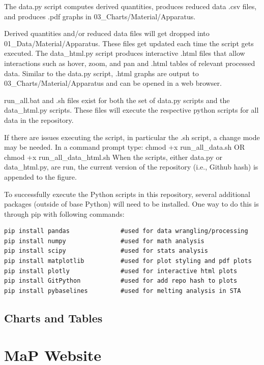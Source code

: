 \documentclass[12pt,oneside]{book}
\begin{document}
The data.py script computes derived quantities, produces reduced data .csv files, and produces .pdf graphs in 03\_Charts/Material/Apparatus.

Derived quantities and/or reduced data files will get dropped into 01\_Data/Material/Apparatus. These files get updated each time the script gets executed.
The data\_html.py script produces interactive .html files that allow interactions such as hover, zoom, and pan and .html tables of relevant processed data. Similar to the data.py script, .html graphs are output to 03\_Charts/Material/Apparatus and can be opened in a web browser.

run\_all.bat and .sh files exist for both the set of data.py scripts and the data\_html.py scripts. These files will execute the respective python scripts for all data in the repository.

If there are issues executing the script, in particular the .sh script, a change mode may be needed. In a command prompt type:
chmod +x run\_all\_data.sh OR chmod +x run\_all\_data\_html.sh
When the scripts, either data.py or data\_html.py, are run, the current version of the repository (i.e., Github hash) is appended to the figure.

To successfully execute the Python scripts in this repository, several additional packages (outside of base Python) will need to be installed. One way to do this is through pip with following commands:

\begin{verbatim}
pip install pandas              #used for data wrangling/processing
pip install numpy               #used for math analysis
pip install scipy               #used for stats analysis
pip install matplotlib          #used for plot styling and pdf plots
pip install plotly              #used for interactive html plots
pip install GitPython           #used for add repo hash to plots
pip install pybaselines         #used for melting analysis in STA
\end{verbatim}

\section{Charts and Tables}
\label{sec:charts}

\chapter{MaP Website}


% 
\end{document}
